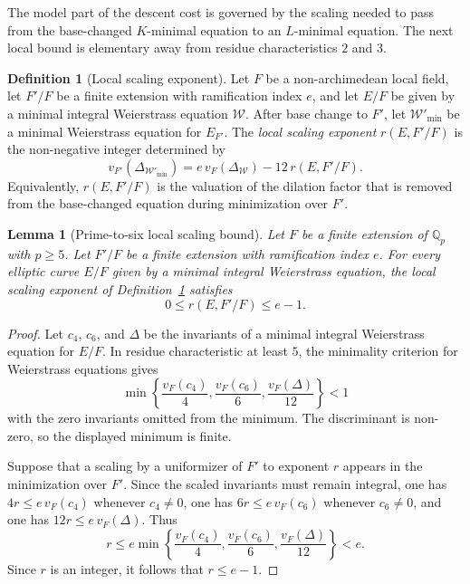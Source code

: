 \documentclass[10pt, reqno]{amsart}
\theoremstyle{plain}
\newtheorem{lemma}[theorem]{Lemma}
\theoremstyle{definition}
\newtheorem{definition}[theorem]{Definition}
\theoremstyle{plain}
\newcommand{\Q}{\mathbb{Q}}
\begin{document}
The model part of the descent cost is governed by the scaling needed to pass from the base-changed $K$-minimal equation to an $L$-minimal equation. The next local bound is elementary away from residue characteristics $2$ and $3$.

\begin{definition}[Local scaling exponent]\label{def:LocalScalingExponent}
Let $F$ be a non-archimedean local field, let $F'/F$ be a finite extension with ramification index $e$, and let $E/F$ be given by a minimal integral Weierstrass equation $\mathcal{W}$. After base change to $F'$, let $\mathcal{W}'_{\min}$ be a minimal Weierstrass equation for $E_{F'}$. The \emph{local scaling exponent} $r(E,F'/F)$ is the non-negative integer determined by
\[
  v_{F'}(\Delta_{\mathcal{W}'_{\min}})
  =
  e\,v_{F}(\Delta_{\mathcal{W}})
  -
  12\,r(E,F'/F).
\]
Equivalently, $r(E,F'/F)$ is the valuation of the dilation factor that is removed from the base-changed equation during minimization over $F'$.
\end{definition}

\begin{lemma}[Prime-to-six local scaling bound]\label{lem:PrimeToSixLocalScalingBound}
Let $F$ be a finite extension of $\Q_{p}$ with $p\ge 5$. Let $F'/F$ be a finite extension with ramification index $e$. For every elliptic curve $E/F$ given by a minimal integral Weierstrass equation, the local scaling exponent of Definition~\ref{def:LocalScalingExponent} satisfies
\[
  0\le r(E,F'/F)\le e-1.
\]
\end{lemma}

\begin{proof}
Let $c_{4}$, $c_{6}$, and $\Delta$ be the invariants of a minimal integral Weierstrass equation for $E/F$. In residue characteristic at least $5$, the minimality criterion for Weierstrass equations gives
\[
  \min
  \left\{
    \frac{v_{F}(c_{4})}{4},
    \frac{v_{F}(c_{6})}{6},
    \frac{v_{F}(\Delta)}{12}
  \right\}
  <1
\]
with the zero invariants omitted from the minimum. The discriminant is non-zero, so the displayed minimum is finite.

Suppose that a scaling by a uniformizer of $F'$ to exponent $r$ appears in the minimization over $F'$. Since the scaled invariants must remain integral, one has $4r\le e\,v_{F}(c_{4})$ whenever $c_{4}\ne 0$, one has $6r\le e\,v_{F}(c_{6})$ whenever $c_{6}\ne 0$, and one has $12r\le e\,v_{F}(\Delta)$. Thus
\[
  r
  \le
  e
  \min
  \left\{
    \frac{v_{F}(c_{4})}{4},
    \frac{v_{F}(c_{6})}{6},
    \frac{v_{F}(\Delta)}{12}
  \right\}
  <e.
\]
Since $r$ is an integer, it follows that $r\le e-1$.
\end{proof}
\end{document}
